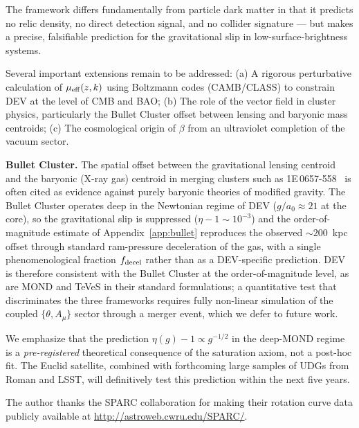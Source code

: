 \documentclass[aps,prd,twocolumn,showpacs,superscriptaddress]{revtex4-2}
\newcommand{\aO}{a_0}
\newcommand{\mueff}{\mu_{\rm eff}}
\begin{document}
The framework differs fundamentally from particle dark matter
in that it predicts no relic density, no direct detection signal,
and no collider signature — but makes a precise, falsifiable
prediction for the gravitational slip in low-surface-brightness systems.

Several important extensions remain to be addressed:
(a) A rigorous perturbative calculation of $\mueff(z,k)$
    using Boltzmann codes (CAMB/CLASS) to constrain DEV at the
    level of CMB and BAO;
(b) The role of the vector field in cluster physics,
    particularly the Bullet Cluster offset between lensing
    and baryonic mass centroids;
(c) The cosmological origin of $\beta$ from an ultraviolet
    completion of the vacuum sector.

\textbf{Bullet Cluster.}
The spatial offset between the gravitational lensing centroid
and the baryonic (X-ray gas) centroid in merging clusters
such as 1E\,0657-558~\cite{Clowe2006} is often cited as
evidence against purely baryonic theories of modified gravity.
The Bullet Cluster operates deep in the Newtonian regime of
DEV ($g/\aO\approx 21$ at the core), so the gravitational slip
is suppressed ($\eta-1\sim 10^{-3}$) and the order-of-magnitude
estimate of Appendix~\ref{app:bullet} reproduces the observed
${\sim}200$~kpc offset through standard ram-pressure deceleration
of the gas, with a single phenomenological fraction
$f_{\rm decel}$ rather than as a DEV-specific prediction. DEV is
therefore consistent with the Bullet Cluster at the
order-of-magnitude level, as are MOND and TeVeS in their
standard formulations; a quantitative test that discriminates
the three frameworks requires fully non-linear simulation of the
coupled $\{\theta, A_\mu\}$ sector through a merger event, which
we defer to future work.

We emphasize that the prediction $\eta(g) - 1 \propto g^{-1/2}$
in the deep-MOND regime is a \emph{pre-registered} theoretical
consequence of the saturation axiom, not a post-hoc fit.
The Euclid satellite, combined with forthcoming large samples of
UDGs from Roman and LSST, will definitively test this prediction
within the next five years.

\begin{acknowledgments}
The author thanks the SPARC collaboration for making
their rotation curve data publicly available at
\url{http://astroweb.cwru.edu/SPARC/}.
\end{acknowledgments}
\end{document}
